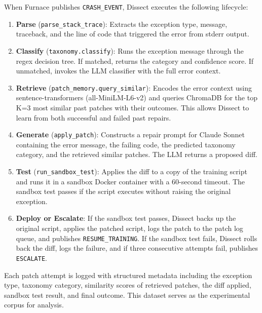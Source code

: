 \documentclass[conference]{IEEEtran}
\begin{document}
When Furnace publishes \texttt{CRASH\_EVENT}, Dissect executes the following lifecycle:

\begin{enumerate}
  \item \textbf{Parse} (\texttt{parse\_stack\_trace}): Extracts the exception type,
  message, traceback, and the line of code that triggered the error from stderr output.

  \item \textbf{Classify} (\texttt{taxonomy.classify}): Runs the exception message
  through the regex decision tree. If matched, returns the category and confidence score.
  If unmatched, invokes the LLM classifier with the full error context.

  \item \textbf{Retrieve} (\texttt{patch\_memory.query\_similar}): Encodes the error
  context using sentence-transformers (all-MiniLM-L6-v2) and queries ChromaDB for the top
  K=3 most similar past patches with their outcomes. This allows Dissect to learn from
  both successful and failed past repairs.

  \item \textbf{Generate} (\texttt{apply\_patch}): Constructs a repair prompt for Claude
  Sonnet containing the error message, the failing code, the predicted taxonomy category,
  and the retrieved similar patches. The LLM returns a proposed diff.

  \item \textbf{Test} (\texttt{run\_sandbox\_test}): Applies the diff to a copy of the
  training script and runs it in a sandbox Docker container with a 60-second timeout. The
  sandbox test passes if the script executes without raising the original exception.

  \item \textbf{Deploy or Escalate}: If the sandbox test passes, Dissect backs up the
  original script, applies the patched script, logs the patch to the patch log queue, and
  publishes \texttt{RESUME\_TRAINING}. If the sandbox test fails, Dissect rolls back the
  diff, logs the failure, and if three consecutive attempts fail, publishes
  \texttt{ESCALATE}.
\end{enumerate}

Each patch attempt is logged with structured metadata including the exception type,
taxonomy category, similarity scores of retrieved patches, the diff applied, sandbox test
result, and final outcome. This dataset serves as the experimental corpus for analysis.
\end{document}
